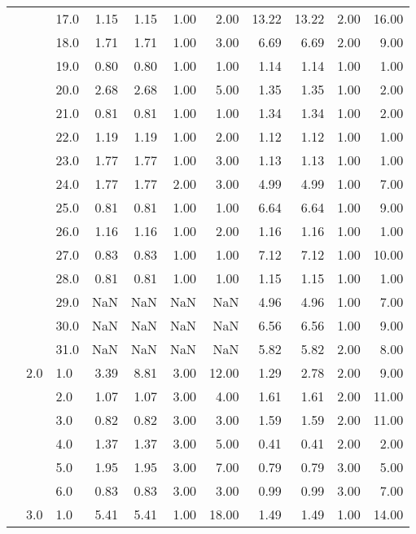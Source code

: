 \begin{tabular}{lllrrrrrrrr}
       &     & 17.0 &       1.15 &      1.15 &  1.00 &   2.00 &      13.22 &     13.22 & 2.00 &  16.00 \\
       &     & 18.0 &       1.71 &      1.71 &  1.00 &   3.00 &       6.69 &      6.69 & 2.00 &   9.00 \\
       &     & 19.0 &       0.80 &      0.80 &  1.00 &   1.00 &       1.14 &      1.14 & 1.00 &   1.00 \\
       &     & 20.0 &       2.68 &      2.68 &  1.00 &   5.00 &       1.35 &      1.35 & 1.00 &   2.00 \\
       &     & 21.0 &       0.81 &      0.81 &  1.00 &   1.00 &       1.34 &      1.34 & 1.00 &   2.00 \\
       &     & 22.0 &       1.19 &      1.19 &  1.00 &   2.00 &       1.12 &      1.12 & 1.00 &   1.00 \\
       &     & 23.0 &       1.77 &      1.77 &  1.00 &   3.00 &       1.13 &      1.13 & 1.00 &   1.00 \\
       &     & 24.0 &       1.77 &      1.77 &  2.00 &   3.00 &       4.99 &      4.99 & 1.00 &   7.00 \\
       &     & 25.0 &       0.81 &      0.81 &  1.00 &   1.00 &       6.64 &      6.64 & 1.00 &   9.00 \\
       &     & 26.0 &       1.16 &      1.16 &  1.00 &   2.00 &       1.16 &      1.16 & 1.00 &   1.00 \\
       &     & 27.0 &       0.83 &      0.83 &  1.00 &   1.00 &       7.12 &      7.12 & 1.00 &  10.00 \\
       &     & 28.0 &       0.81 &      0.81 &  1.00 &   1.00 &       1.15 &      1.15 & 1.00 &   1.00 \\
       &     & 29.0 &        NaN &       NaN &   NaN &    NaN &       4.96 &      4.96 & 1.00 &   7.00 \\
       &     & 30.0 &        NaN &       NaN &   NaN &    NaN &       6.56 &      6.56 & 1.00 &   9.00 \\
       &     & 31.0 &        NaN &       NaN &   NaN &    NaN &       5.82 &      5.82 & 2.00 &   8.00 \\
       & 2.0 & 1.0  &       3.39 &      8.81 &  3.00 &  12.00 &       1.29 &      2.78 & 2.00 &   9.00 \\
       &     & 2.0  &       1.07 &      1.07 &  3.00 &   4.00 &       1.61 &      1.61 & 2.00 &  11.00 \\
       &     & 3.0  &       0.82 &      0.82 &  3.00 &   3.00 &       1.59 &      1.59 & 2.00 &  11.00 \\
       &     & 4.0  &       1.37 &      1.37 &  3.00 &   5.00 &       0.41 &      0.41 & 2.00 &   2.00 \\
       &     & 5.0  &       1.95 &      1.95 &  3.00 &   7.00 &       0.79 &      0.79 & 3.00 &   5.00 \\
       &     & 6.0  &       0.83 &      0.83 &  3.00 &   3.00 &       0.99 &      0.99 & 3.00 &   7.00 \\
       & 3.0 & 1.0  &       5.41 &      5.41 &  1.00 &  18.00 &       1.49 &      1.49 & 1.00 &  14.00 \\
\bottomrule
\end{tabular}
